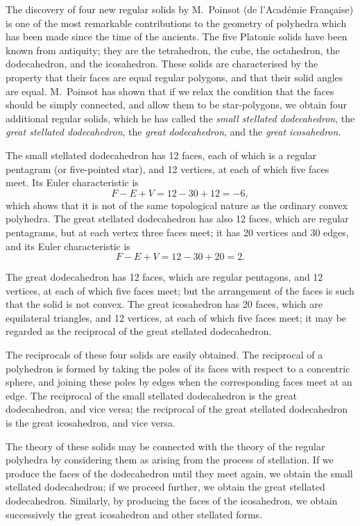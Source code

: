 \documentclass[11pt,a4paper]{article}
\begin{document}
The discovery of four new regular solids by M.~Poinsot (de l'Académie Fran\c{c}aise) is one of the most remarkable contributions to the geometry of polyhedra which has been made since the time of the ancients. The five Platonic solids have been known from antiquity; they are the tetrahedron, the cube, the octahedron, the dodecahedron, and the icosahedron. These solids are characterised by the property that their faces are equal regular polygons, and that their solid angles are equal. M.~Poinsot has shown that if we relax the condition that the faces should be simply connected, and allow them to be star-polygons, we obtain four additional regular solids, which he has called the \textit{small stellated dodecahedron}, the \textit{great stellated dodecahedron}, the \textit{great dodecahedron}, and the \textit{great icosahedron}.

\setcounter{page}{82}

The small stellated dodecahedron has 12 faces, each of which is a regular pentagram (or five-pointed star), and 12 vertices, at each of which five faces meet. Its Euler characteristic is
\[
F - E + V = 12 - 30 + 12 = -6,
\]
which shows that it is not of the same topological nature as the ordinary convex polyhedra. The great stellated dodecahedron has also 12 faces, which are regular pentagrams, but at each vertex three faces meet; it has 20 vertices and 30 edges, and its Euler characteristic is
\[
F - E + V = 12 - 30 + 20 = 2.
\]

The great dodecahedron has 12 faces, which are regular pentagons, and 12 vertices, at each of which five faces meet; but the arrangement of the faces is such that the solid is not convex. The great icosahedron has 20 faces, which are equilateral triangles, and 12 vertices, at each of which five faces meet; it may be regarded as the reciprocal of the great stellated dodecahedron.

\setcounter{page}{83}

The reciprocals of these four solids are easily obtained. The reciprocal of a polyhedron is formed by taking the poles of its faces with respect to a concentric sphere, and joining these poles by edges when the corresponding faces meet at an edge. The reciprocal of the small stellated dodecahedron is the great dodecahedron, and vice versa; the reciprocal of the great stellated dodecahedron is the great icosahedron, and vice versa.

The theory of these solids may be connected with the theory of the regular polyhedra by considering them as arising from the process of stellation. If we produce the faces of the dodecahedron until they meet again, we obtain the small stellated dodecahedron; if we proceed further, we obtain the great stellated dodecahedron. Similarly, by producing the faces of the icosahedron, we obtain successively the great icosahedron and other stellated forms.
\end{document}
